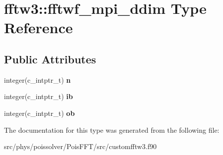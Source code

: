 \hypertarget{structfftw3_1_1fftwf__mpi__ddim}{}\section{fftw3\+:\+:fftwf\+\_\+mpi\+\_\+ddim Type Reference}
\label{structfftw3_1_1fftwf__mpi__ddim}
\subsection*{Public Attributes}
\begin{DoxyCompactItemize}
\item 
integer(c\+\_\+intptr\+\_\+t) {\bfseries n}\hypertarget{structfftw3_1_1fftwf__mpi__ddim_a5c269ac2e5beaa42cf711d77c64b9e4a}{}\label{structfftw3_1_1fftwf__mpi__ddim_a5c269ac2e5beaa42cf711d77c64b9e4a}

\item 
integer(c\+\_\+intptr\+\_\+t) {\bfseries ib}\hypertarget{structfftw3_1_1fftwf__mpi__ddim_a26a2f90b8eba0853bde4aaee02b1f7e1}{}\label{structfftw3_1_1fftwf__mpi__ddim_a26a2f90b8eba0853bde4aaee02b1f7e1}

\item 
integer(c\+\_\+intptr\+\_\+t) {\bfseries ob}\hypertarget{structfftw3_1_1fftwf__mpi__ddim_a2e7b7cbb3bd2ed515dce9d6d0fdea92a}{}\label{structfftw3_1_1fftwf__mpi__ddim_a2e7b7cbb3bd2ed515dce9d6d0fdea92a}

\end{DoxyCompactItemize}


The documentation for this type was generated from the following file\+:\begin{DoxyCompactItemize}
\item 
src/phys/poissolver/\+Pois\+F\+F\+T/src/customfftw3.\+f90\end{DoxyCompactItemize}
